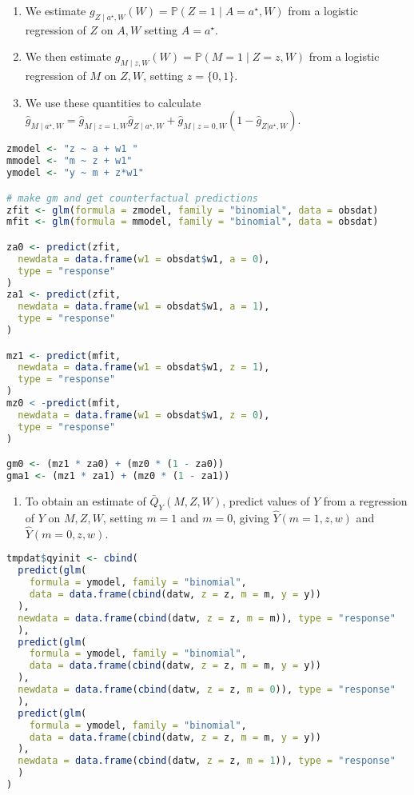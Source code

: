 \documentclass[
  12pt,
]{book}
\providecommand{\tightlist}{%
  \setlength{\itemsep}{0pt}\setlength{\parskip}{0pt}}
\theoremstyle{definition}
\theoremstyle{definition}
\theoremstyle{definition}
\renewcommand{\P}{\mathbb{P}}
\newcommand{\1}{\mathbbm{1}}
\begin{document}
\begin{enumerate}
\def\labelenumi{\arabic{enumi}.}
\tightlist
\item
  We estimate \(g_{Z \mid a^{\star}, W}(W) = \P(Z=1 \mid A=a^{\star}, W)\) from
  a logistic regression of \(Z\) on \(A, W\) setting \(A=a^{\star}\).
\item
  We then estimate \(g_{M \mid z,W}(W) = \P(M=1 \mid Z=z, W)\) from a logistic
  regression of \(M\) on \(Z, W\), setting \(z=\{0,1\}\).
\item
  We use these quantities to calculate \(\hat{g}_{M \mid a^{\star}, W} = \hat{g}_{M \mid z=1,W}\hat{g}_{Z \mid a^{\star}, W} + \hat{g}_{M \mid z=0,W}(1-\hat{g}_{Z|a^{\star}, W})\).
\end{enumerate}

\begin{lstlisting}[language=R]
zmodel <- "z ~ a + w1 "
mmodel <- "m ~ z + w1"
ymodel <- "y ~ m + z*w1"

# make gm and get counterfactual predictions
zfit <- glm(formula = zmodel, family = "binomial", data = obsdat)
mfit <- glm(formula = mmodel, family = "binomial", data = obsdat)

za0 <- predict(zfit,
  newdata = data.frame(w1 = obsdat$w1, a = 0),
  type = "response"
)
za1 <- predict(zfit,
  newdata = data.frame(w1 = obsdat$w1, a = 1),
  type = "response"
)

mz1 <- predict(mfit,
  newdata = data.frame(w1 = obsdat$w1, z = 1),
  type = "response"
)
mz0 < -predict(mfit,
  newdata = data.frame(w1 = obsdat$w1, z = 0),
  type = "response"
)

gm0 <- (mz1 * za0) + (mz0 * (1 - za0))
gma1 <- (mz1 * za1) + (mz0 * (1 - za1))
\end{lstlisting}

\begin{enumerate}
\def\labelenumi{\arabic{enumi}.}
\setcounter{enumi}{3}
\tightlist
\item
  To obtain an estimate of \(\bar{Q}_{Y}(M,Z,W)\), predict values of \(Y\) from a
  regression of \(Y\) on \(M,Z,W\), setting \(m=1\) and \(m=0\), giving
  \(\hat{Y}(m=1, z, w)\) and \(\hat{Y}(m=0, z, w)\).
\end{enumerate}

\begin{lstlisting}[language=R]
tmpdat$qyinit <- cbind(
  predict(glm(
    formula = ymodel, family = "binomial",
    data = data.frame(cbind(datw, z = z, m = m, y = y))
  ),
  newdata = data.frame(cbind(datw, z = z, m = m)), type = "response"
  ),
  predict(glm(
    formula = ymodel, family = "binomial",
    data = data.frame(cbind(datw, z = z, m = m, y = y))
  ),
  newdata = data.frame(cbind(datw, z = z, m = 0)), type = "response"
  ),
  predict(glm(
    formula = ymodel, family = "binomial",
    data = data.frame(cbind(datw, z = z, m = m, y = y))
  ),
  newdata = data.frame(cbind(datw, z = z, m = 1)), type = "response"
  )
)
\end{lstlisting}
\end{document}
